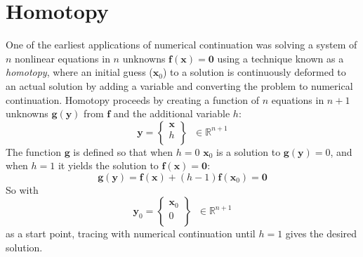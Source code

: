 \documentclass[10pt,openany,twoside]{book}
\numberwithin{equation}{section}   %
\newcommand{\Newterm}[1]{{\em #1}}
\newcommand{\Vector}[1]{\boldsymbol{#1}}
\begin{document}
\section{Homotopy}\label{sect:homotopy}
One of the earliest applications of numerical continuation was solving a system
of $n$ nonlinear equations in $n$ unknowns
$\Vector{f}(\Vector{x})=\Vector{0}$ using a
technique known as a \Newterm{homotopy},
where an initial guess ($\Vector{x}_0$) to a solution is continuously
deformed to an actual solution by adding a variable and converting the
problem to numerical continuation.
Homotopy proceeds by creating a function of $n$ equations in $n+1$
unknowns
$\Vector{g}(\Vector{y})$
from 
$\Vector{f}$ and the additional variable $h$:
\begin{equation}
\Vector{y} = \left\{\begin{array}{c}
	\Vector{x} \\
	h \\
\end{array} \right\} \;\; \in \mathbb{R}^{n+1} \nonumber
\end{equation}
The function $\Vector{g}$ is defined so that when $h = 0$
$\Vector{x}_0$
is a solution to $\Vector{g}(\Vector{y})=0$, and when $h = 1$ it
yields the solution to $\Vector{f}(\Vector{x}) = \Vector{0}$:
\begin{equation*}
\Vector{g}(\Vector{y}) = \Vector{f}(\Vector{x})
	+ (h - 1)\Vector{f}(\Vector{x}_0) = \Vector{0}
\end{equation*}
So with
\begin{equation}
\Vector{y}_0 = \left\{\begin{array}{c}
\Vector{x}_0 \\
0 \\
\end{array} \right\} \;\; \in \mathbb{R}^{n+1} \nonumber
\end{equation}
as a start point, tracing with numerical continuation until
$h=1$ gives the desired solution.
\end{document}

